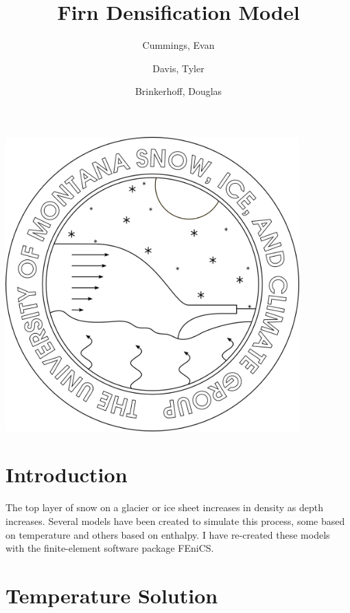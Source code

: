 \documentclass{article}%
\begin{document}

\title{Firn Densification Model}
\author{Cummings, Evan \and Davis, Tyler \and Brinkerhoff, Douglas}
\maketitle
\begin{center}
\includegraphics[width=4.455666122085252in]{images/logoPlain.png}
\end{center}

\twocolumn


\section{Introduction}

The top layer of snow on a glacier or ice sheet increases in density as depth increases.  Several models have been created to simulate this process, some based on temperature and others based on enthalpy.  I have re-created these models with the finite-element software package FEniCS.

\section{Temperature Solution}
\end{document}
